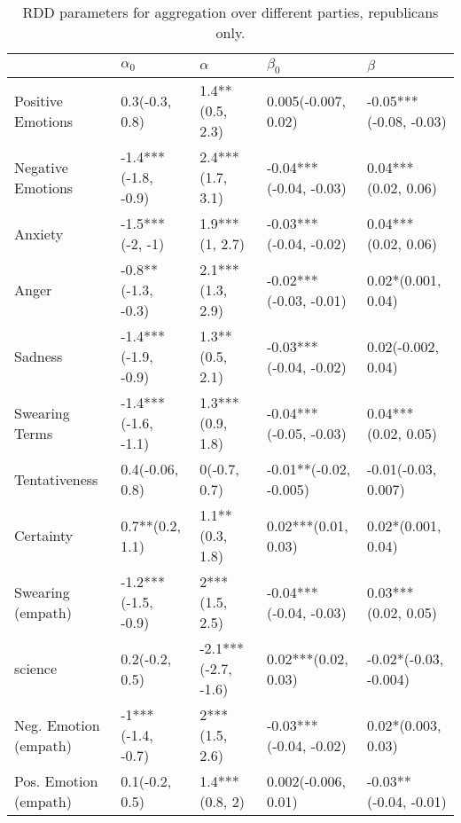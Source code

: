 \begin{table}[h]\centering
\caption{RDD parameters for aggregation over different parties, republicans only.}
	\label{fig: Party_3}
\begin{adjustbox}{width=\linewidth, center}
	\begin{tabular}{lllll}
	\toprule
	{} &           $\alpha_0$ &             $\alpha$ &               $\beta_0$ &                 $\beta$ \\
	\midrule
	Positive Emotions     &       0.3(-0.3, 0.8) &      1.4**(0.5, 2.3) &     0.005(-0.007, 0.02) &  -0.05***(-0.08, -0.03) \\
	Negative Emotions     &  -1.4***(-1.8, -0.9) &     2.4***(1.7, 3.1) &  -0.04***(-0.04, -0.03) &     0.04***(0.02, 0.06) \\
	Anxiety               &      -1.5***(-2, -1) &       1.9***(1, 2.7) &  -0.03***(-0.04, -0.02) &     0.04***(0.02, 0.06) \\
	Anger                 &   -0.8**(-1.3, -0.3) &     2.1***(1.3, 2.9) &  -0.02***(-0.03, -0.01) &      0.02*(0.001, 0.04) \\
	Sadness               &  -1.4***(-1.9, -0.9) &      1.3**(0.5, 2.1) &  -0.03***(-0.04, -0.02) &      0.02(-0.002, 0.04) \\
	Swearing Terms        &  -1.4***(-1.6, -1.1) &     1.3***(0.9, 1.8) &  -0.04***(-0.05, -0.03) &     0.04***(0.02, 0.05) \\
	Tentativeness         &      0.4(-0.06, 0.8) &         0(-0.7, 0.7) &  -0.01**(-0.02, -0.005) &     -0.01(-0.03, 0.007) \\
	Certainty             &      0.7**(0.2, 1.1) &      1.1**(0.3, 1.8) &     0.02***(0.01, 0.03) &      0.02*(0.001, 0.04) \\
	Swearing (empath)     &  -1.2***(-1.5, -0.9) &       2***(1.5, 2.5) &  -0.04***(-0.04, -0.03) &     0.03***(0.02, 0.05) \\
	science               &       0.2(-0.2, 0.5) &  -2.1***(-2.7, -1.6) &     0.02***(0.02, 0.03) &   -0.02*(-0.03, -0.004) \\
	Neg. Emotion (empath) &    -1***(-1.4, -0.7) &       2***(1.5, 2.6) &  -0.03***(-0.04, -0.02) &      0.02*(0.003, 0.03) \\
	Pos. Emotion (empath) &       0.1(-0.2, 0.5) &       1.4***(0.8, 2) &     0.002(-0.006, 0.01) &   -0.03**(-0.04, -0.01) \\
	\bottomrule
	\end{tabular}
	
\end{adjustbox}
	\end{table}


